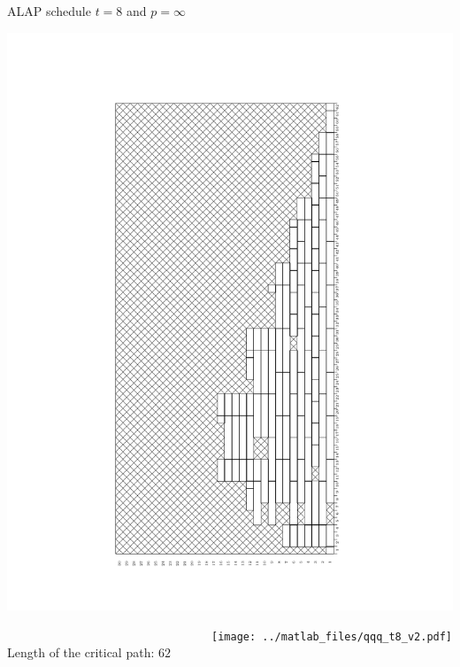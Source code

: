 \begin{frame}
ALAP schedule $t=8$ and $p=\infty$\\

  {\begin{minipage}{.25\textwidth}\vspace*{-2.8cm}
  \includegraphics[width=\textwidth,angle=270]{./fig/t8_p30_bwd.pdf}\end{minipage}}
  ~~~~~~~~~~~~~~~~~~~~~~~~~~~~~~~~~\texttt{[image: ../matlab\_files/qqq\_t8\_v2.pdf]}\\

Length of the critical path: $62$

\end{frame}



